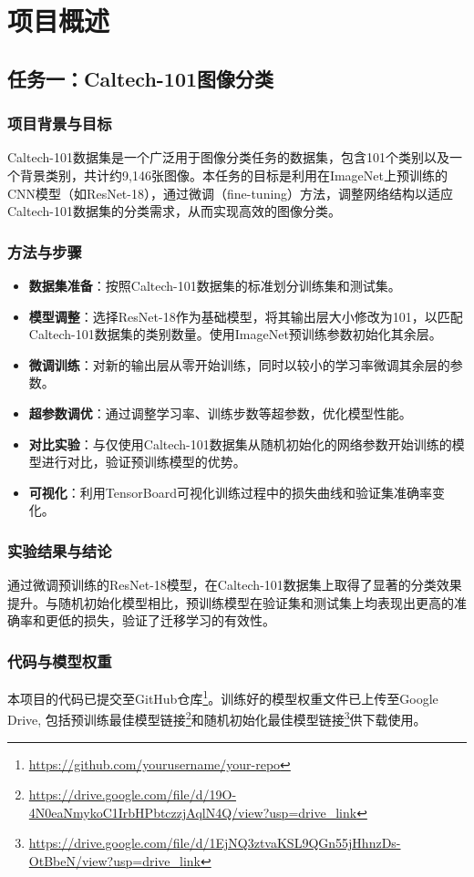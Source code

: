 \section*{项目概述}

\subsection{任务一：Caltech-101图像分类}

\subsubsection{项目背景与目标}
Caltech-101数据集是一个广泛用于图像分类任务的数据集，包含101个类别以及一个背景类别，共计约9,146张图像。本任务的目标是利用在ImageNet上预训练的CNN模型（如ResNet-18），通过微调（fine-tuning）方法，调整网络结构以适应Caltech-101数据集的分类需求，从而实现高效的图像分类。

\subsubsection{方法与步骤}
\begin{itemize}
    \item \textbf{数据集准备}：按照Caltech-101数据集的标准划分训练集和测试集。
    \item \textbf{模型调整}：选择ResNet-18作为基础模型，将其输出层大小修改为101，以匹配Caltech-101数据集的类别数量。使用ImageNet预训练参数初始化其余层。
    \item \textbf{微调训练}：对新的输出层从零开始训练，同时以较小的学习率微调其余层的参数。
    \item \textbf{超参数调优}：通过调整学习率、训练步数等超参数，优化模型性能。
    \item \textbf{对比实验}：与仅使用Caltech-101数据集从随机初始化的网络参数开始训练的模型进行对比，验证预训练模型的优势。
    \item \textbf{可视化}：利用TensorBoard可视化训练过程中的损失曲线和验证集准确率变化。
\end{itemize}

\subsubsection{实验结果与结论}
通过微调预训练的ResNet-18模型，在Caltech-101数据集上取得了显著的分类效果提升。与随机初始化模型相比，预训练模型在验证集和测试集上均表现出更高的准确率和更低的损失，验证了迁移学习的有效性。

\subsubsection{代码与模型权重}
本项目的代码已提交至GitHub仓库\footnote{\url{https://github.com/yourusername/your-repo}}。训练好的模型权重文件已上传至Google Drive, 包括预训练最佳模型链接\footnote{\url{https://drive.google.com/file/d/19O-4N0eaNmykoC1IrbHPbtczzjAqlN4Q/view?usp=drive_link}}和随机初始化最佳模型链接\footnote{\url{https://drive.google.com/file/d/1EjNQ3ztvaKSL9QGn55jHhnzDs-OtBbeN/view?usp=drive_link}}供下载使用。
